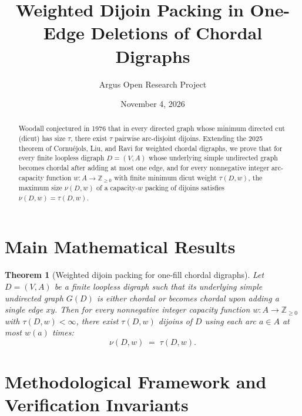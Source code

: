 \documentclass[10pt,reqno]{amsart}
\title[Weighted Dijoin Packing in One-Fill Chordal Digraphs]
{Weighted Dijoin Packing in One-Edge Deletions of Chordal Digraphs}
\author{Argus Open Research Project}
\date{November 4, 2026}
\newtheorem{theorem}{Theorem}[section]
\theoremstyle{definition}
\begin{document}
\begin{abstract}
Woodall conjectured in 1976 that in every directed graph whose minimum directed cut (dicut) has size $\tau$, there exist $\tau$ pairwise arc-disjoint dijoins. Extending the 2025 theorem of Cornu\'ejols, Liu, and Ravi for weighted chordal digraphs, we prove that for every finite loopless digraph $D=(V,A)$ whose underlying simple undirected graph becomes chordal after adding at most one edge, and for every nonnegative integer arc-capacity function $w \colon A \to \mathbb{Z}_{\ge 0}$ with finite minimum dicut weight $\tau(D,w)$, the maximum size $\nu(D,w)$ of a capacity-$w$ packing of dijoins satisfies $\nu(D,w) = \tau(D,w)$.
\end{abstract}
\maketitle

\section{Main Mathematical Results}
\begin{theorem}[Weighted dijoin packing for one-fill chordal digraphs]
Let $D=(V,A)$ be a finite loopless digraph such that its underlying simple undirected graph $G(D)$ is either chordal or becomes chordal upon adding a single edge $xy$. Then for every nonnegative integer capacity function $w \colon A \to \mathbb{Z}_{\ge 0}$ with $\tau(D,w) < \infty$, there exist $\tau(D,w)$ dijoins of $D$ using each arc $a \in A$ at most $w(a)$ times:
\[
  \nu(D,w) \;=\; \tau(D,w).
\]
\end{theorem}

\section{Methodological Framework and Verification Invariants}
\end{document}
